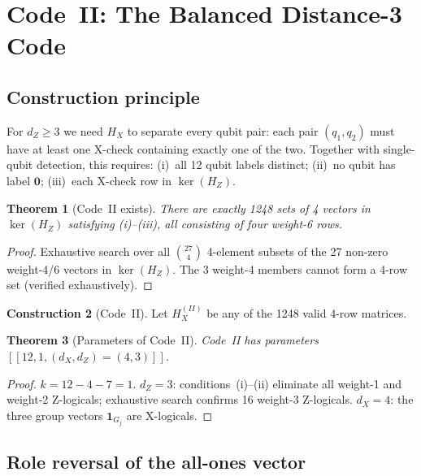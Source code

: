 \documentclass[12pt,a4paper]{article}
\theoremstyle{plain}
\newtheorem{theorem}{Theorem}[section]
\theoremstyle{definition}
\newtheorem{construction}[theorem]{Construction}
\theoremstyle{remark}
\newcommand{\HZ}{H_Z}
\begin{document}
\section{Code~II: The Balanced Distance-3 Code}\label{sec:codeII}

\subsection{Construction principle}

For $d_Z \geq 3$ we need $H_X$ to separate every qubit pair:
each pair $(q_1,q_2)$ must have at least one X-check containing
exactly one of the two.
Together with single-qubit detection, this requires:
(i)~all 12 qubit labels distinct;
(ii)~no qubit has label $\bm{0}$;
(iii)~each X-check row in $\ker(\HZ)$.

\begin{theorem}[Code~II exists]\label{thm:codeII_exists}
There are exactly 1248 sets of 4 vectors in $\ker(\HZ)$ satisfying
(i)--(iii), all consisting of four weight-6 rows.
\end{theorem}
\begin{proof}
Exhaustive search over all $\binom{27}{4}$ 4-element subsets of the
27 non-zero weight-4/6 vectors in $\ker(\HZ)$.
The 3 weight-4 members cannot form a 4-row set (verified exhaustively).
\end{proof}

\begin{construction}[Code~II]\label{con:codeII}
Let $H_X^{(II)}$ be any of the 1248 valid 4-row matrices.
\end{construction}

\begin{theorem}[Parameters of Code~II]\label{thm:codeII}
Code~II has parameters $[[12, 1, (d_X,d_Z)=(4,3)]]$.
\end{theorem}
\begin{proof}
$k = 12 - 4 - 7 = 1$.
$d_Z = 3$: conditions~(i)--(ii) eliminate all weight-1 and weight-2
Z-logicals; exhaustive search confirms 16 weight-3 Z-logicals.
$d_X = 4$: the three group vectors $\bm{1}_{G_j}$ are X-logicals.
\end{proof}

\subsection{Role reversal of the all-ones vector}
\end{document}
